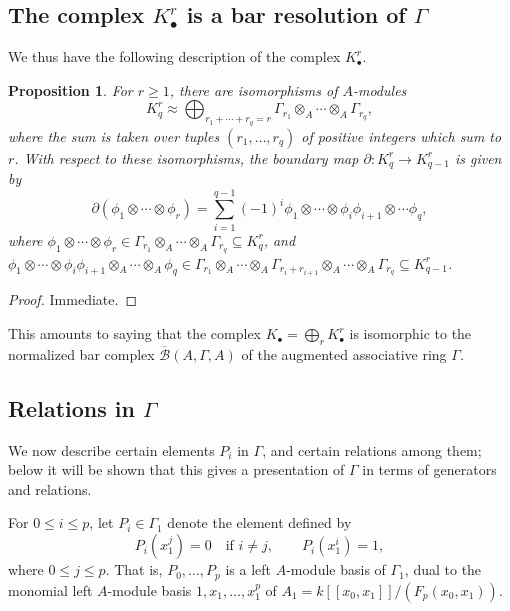 \documentclass[11pt]{amsart}
\numberwithin{equation}{section}
\theoremstyle{plain}
\newtheorem{prop}[subsection]{Proposition}
\theoremstyle{remark}
\theoremstyle{plain}
\begin{document}
\subsection{The complex $K^r_\bullet$ is a bar resolution of $\Gamma$}

We thus have the following description of the complex $K^r_\bullet$.
\begin{prop}
For $r\geq1$, there are isomorphisms of $A$-modules
\[
K_q^r \approx \bigoplus_{r_1+\cdots+r_q=r} \Gamma_{r_1}\otimes_A
\cdots\otimes_A \Gamma_{r_q},
\]
where the sum is taken over tuples $(r_1,\dots,r_q)$ of positive
integers which sum to $r$.  With respect to these isomorphisms, the
boundary map $\partial \colon K_q^r{\rightarrow} K_{q-1}^r$ is given by
\[
\partial (\phi_1\otimes\cdots \otimes \phi_r) = 
\sum_{i=1}^{q-1}(-1)^i
\phi_1\otimes\cdots \otimes \phi_i\phi_{i+1}\otimes \cdots \phi_q,
\]
where $\phi_1\otimes\cdots \otimes \phi_r\in \Gamma_{r_1}\otimes_A
\cdots \otimes_A \Gamma_{r_q}\subseteq K^r_q$, and $\phi_1\otimes\cdots \otimes
\phi_i\phi_{i+1}\otimes_A \cdots \otimes_A \phi_q\in
\Gamma_{r_1}\otimes_A \cdots \otimes_A \Gamma_{r_i+r_{i+1}}\otimes_A
\cdots \otimes_A \Gamma_{r_q}\subseteq K^r_{q-1}$.
\end{prop}
\begin{proof}
  Immediate.
\end{proof}

This amounts to saying that the complex $K_\bullet = \bigoplus_r
K_\bullet^r$ is 
isomorphic to the normalized bar complex
$\overline{\mathcal{B}}(A,\Gamma,A)$ of the augmented associative
ring $\Gamma$.

\subsection{Relations in $\Gamma$}
\label{subsec:relations-in-gamma}

We now describe certain elements $P_i$ in $\Gamma$, and certain
relations among them; below it will be shown that this gives a
presentation of $\Gamma$ in terms of generators and relations.

For $0\leq i\leq p$, let $P_i\in \Gamma_1$ denote the element defined
by
\[
P_i(x_1^j) = 0\quad\text{if $i\neq j$}, \qquad P_i(x_1^i)=1,
\]
where $0\leq j\leq p$.
That is, $P_0,\dots,P_p$ is a left $A$-module basis of $\Gamma_1$,
dual to the monomial left $A$-module basis $1,x_1,\dots,x_1^p$ of
$A_1=k{[\![{x_0,x_1}]\!]}/(F_p(x_0,x_1))$.  
\end{document}
